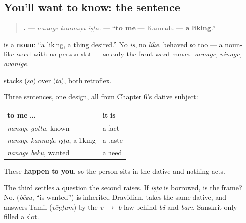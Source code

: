 \subsection*{You'll want to know: the sentence}
\begin{quote}
\textbf{  .} — \emph{nanage kannaḍa iṣṭa.} — \textquotedblleft{}\textbf{to me} — Kannada — \textbf{a liking}.\textquotedblright{}
\end{quote}

\textbf{} is a \textbf{noun}: \textquotedblleft{}a liking, a thing desired.\textquotedblright{} No \emph{is}, no \emph{like}. \textbf{} behaved so too — a noun-like word with no person slot — so only the front word moves: \emph{nanage}, \emph{ninage}, \emph{avanige}.

\begin{sounds}
\textbf{} stacks \textbf{} (\emph{ṣa}) over \textbf{} (\emph{ṭa}), both retroflex.
\end{sounds}

\begin{grammarlens}[title={Grammar Lens: the frame is native even where the word is not}]
Three sentences, one design, all from Chapter 6's dative subject:

\noindent
\begin{tabularx}{\linewidth}{@{}>{\raggedright\arraybackslash}X>{\raggedright\arraybackslash}X@{}}
\toprule
\textbf{to me …} & \textbf{it is} \\
\midrule
\emph{nanage gottu}, known & a fact \\
\emph{nanage kannaḍa iṣṭa}, a liking & a taste \\
\emph{nanage bēku}, wanted & a need \\
\bottomrule
\end{tabularx}

These \textbf{happen to you}, so the person sits in the dative and nothing acts.

The third settles a question the second raises. If \emph{iṣṭa} is borrowed, is the frame? No. \textbf{} (\emph{bēku}, \textquotedblleft{}is wanted\textquotedblright{}) is inherited Dravidian, takes the same dative, and answers Tamil \textbf{} (\emph{vēṇṭum}) by the \emph{v} $\to$ \emph{b} law behind \emph{bā} and \emph{bare}. Sanskrit only filled a slot.
\end{grammarlens}


